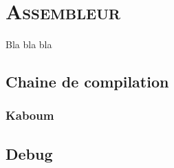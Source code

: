 \chapter{\textsc{Assembleur}}

Bla bla bla


\section{Chaine de compilation}


\subsection{Kaboum}






\section{Debug}